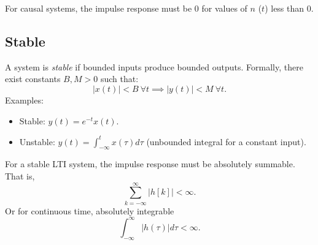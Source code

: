 For causal systems, the impulse response must be 0 for values of $n$ ($t$)
less than 0.

\subsection{Stable}
A system is \emph{stable} if bounded inputs produce
bounded outputs. Formally, there exist constants \( B, M > 0 \)
such that:
\[
    |x(t)| < B \ \forall t \implies |y(t)| < M \ \forall t.
\]
Examples:
\begin{itemize}
    \item Stable: \( y(t) = e^{-t}x(t) \).
    \item Unstable: \( y(t) = \int_{-\infty}^t x(\tau) d\tau \)
          (unbounded integral for a constant input).
\end{itemize}

For a stable LTI system, the impulse response must be absolutely summable.
That is,
\begin{equation}
    \sum_{k=-\infty}^{\infty} |h[k]| < \infty.
\end{equation}
Or for continuous time, absolutely integrable
\begin{equation}
    \int_{-\infty}^{\infty} |h(\tau)| d\tau < \infty.
\end{equation}